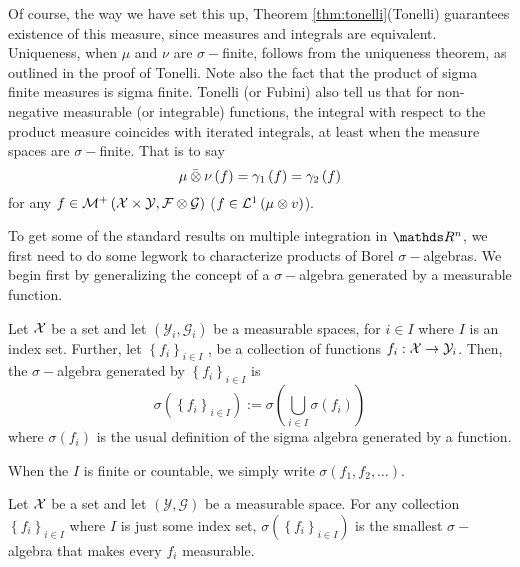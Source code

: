 Of course, the way we have set this up, Theorem \ref{thm:tonelli}(Tonelli)
guarantees existence of this measure, since measures and integrals
are equivalent. Uniqueness, when $\mu$ and $\nu$ are $\sigma-$finite,
follows from the uniqueness theorem, as outlined in the proof of Tonelli.
Note also the fact that the product of sigma finite measures is sigma
finite. Tonelli (or Fubini) also tell us that for non-negative measurable
(or integrable) functions, the integral with respect to the product
measure coincides with iterated integrals, at least when the measure
spaces are $\sigma-$finite. That is to say
\[
\bar{\mu\otimes\nu}\left(f\right)=\gamma_{1}\left(f\right)=\gamma_{2}\left(f\right)
\]
for any $f\in\mathcal{M}^{+}\left(\mathcal{X}\times\mathcal{Y},\mathcal{F}\otimes\mathcal{G}\right)$
($f\in\mathcal{L}^{1}\left(\mu\otimes v\right)$).

To get some of the standard results on multiple integration in $\R^{n}$,
we first need to do some legwork to characterize products of Borel
$\sigma-$algebras. We begin first by generalizing the concept of
a $\sigma-$algebra generated by a measurable function.
\begin{defn}
\label{def:sigmaMultipleMeasurableFunctions}Let $\mathcal{X}$ be a set and
let $\left(\mathcal{Y}_{i},\mathcal{G}_{i}\right)$ be a measurable
spaces, for $i\in I$ where $I$ is an index set. Further, let $\left\{ f_{i}\right\} _{i\in I}$
, be a collection of functions $f_{i}:\mathcal{X}\to\mathcal{Y}_{i}$. Then,
the $\sigma-$algebra generated by $\left\{ f_{i}\right\} _{i\in I}$
is 
\[
\sigma\left(\left\{ f_{i}\right\} _{i\in I}\right):=\sigma\left(\bigcup_{i\in I}\sigma\left(f_{i}\right)\right)
\]
where $\sigma\left(f_{i}\right)$ is the usual definition of the sigma
algebra generated by a function.
\end{defn}

\begin{rem*}
When the $I$ is finite or countable, we simply write $\sigma\left(f_{1},f_{2},\ldots\right)$.
\end{rem*}
\begin{prop}
\label{prop:sigmaAlgebraGenCollectionSmallest}Let $\mathcal{X}$ be a set
and let $\left(\mathcal{Y},\mathcal{G}\right)$ be a measurable space.
For any collection $\left\{ f_{i}\right\} _{i\in I}$ where $I$ is
just some index set, $\sigma\left(\left\{ f_{i}\right\} _{i\in I}\right)$
is the smallest $\sigma-$algebra that makes every $f_{i}$ measurable.
\end{prop}


